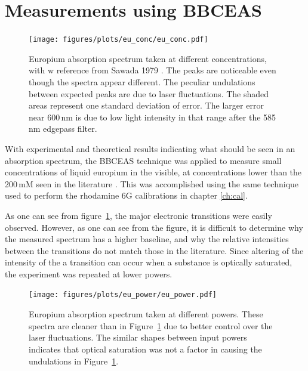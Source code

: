 \section{Measurements using BBCEAS}\label{sec:eu_measurements}

\begin{figure}[t]
\begin{center}
\texttt{[image: figures/plots/eu\_conc/eu\_conc.pdf]}
\end{center}
\caption[Europium Absorption Spectra at different Concentrations]{Europium absorption spectrum taken at different concentrations, with w reference from Sawada 1979 \cite{Sawada:1979vca}. The peaks are noticeable even though the spectra appear different. The peculiar undulations between expected peaks are due to laser fluctuations. The shaded areas represent one standard deviation of error. The larger error near 600\,nm is due to low light intensity in that range after the 585\,nm edgepass filter.}
\label{fig:eu_conc}
\end{figure}

With experimental and theoretical results indicating what should be seen in
an absorption spectrum, the \ac{BBCEAS} technique was applied to measure
small concentrations of liquid europium in the visible, at concentrations
lower than the 200\,mM seen in the literature \cite{Sawada:1979vca}. This
was accomplished using the same technique used to perform the rhodamine 6G
calibrations in chapter \ref{ch:cal}.

As one can see from figure~\ref{fig:eu_conc}, the major electronic transitions
were easily observed. However, as one can see from the figure, it is difficult
to determine why the measured spectrum has a higher baseline, and why the
relative intensities between the transitions do not match those in the
literature. Since altering of the intensity of the a transition can occur
when a substance is optically saturated, the experiment was repeated at lower
powers.

\begin{figure}[t]
\begin{center}
  \texttt{[image: figures/plots/eu\_power/eu\_power.pdf]}
\end{center}
\caption[Europium Absorption Spectra at different Input Intensities]{Europium absorption spectrum taken at different powers. These spectra are cleaner than in Figure~\ref{fig:eu_conc} due to better control over the laser fluctuations. The similar shapes between input powers indicates that optical saturation was not a factor in causing the undulations in Figure~\ref{fig:eu_conc}.}
\label{fig:eu_power}
\end{figure}

